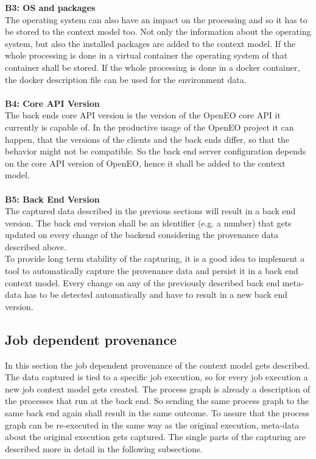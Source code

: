 \documentclass[draft,final]{vutinfth} %
\begin{document}
\textbf{B3: OS and packages} \\
The operating system can also have an impact on the processing and so it has to be stored to the context model too. Not only the information about the operating system, but also the installed packages are added to the context model. If the whole processing is done in a virtual container the operating system of that container shall be stored. If the whole processing is done in a docker container, the docker description file can be used for the environment data. 
\\ \\
\textbf{B4: Core API Version} \\
The back ends core API version is the version of the OpenEO core API it currently is capable of. In the productive usage of the OpenEO project it can happen, that the versions of the clients and the back ends differ, so that the behavior might not be compatible. So the back end server configuration depends on the core API version of OpenEO, hence it shall be added to the context model.
\\ \\
\textbf{B5: Back End Version} \\
The captured data described in the previous sections will result in a back end version. The back end version shall be an identifier (e.g. a number) that gets updated on every change of the backend considering the provenance data described above. 
\\
To  provide long term stability of the capturing, it is a good idea to implement a tool to automatically capture the provenance data and persist it in a back end context model. Every change on any of the previously described back end meta-data has to be detected automatically and have to result in a new back end version.  


\subsection{Job dependent provenance}\label{Design:Job dependent provenance}
In this section the job dependent provenance of the context model gets described. The data captured is tied to a specific job execution, so for every job execution a new job context model gets created. The process graph is already a description of the processes that run at the back end. So sending the same process graph to the same back end again shall result in the same outcome. To assure that the process graph can be re-executed in the same way as the original execution, meta-data about the original execution gets captured. 
The single parts of the capturing are described more in detail in the following subsections. 
\end{document}
